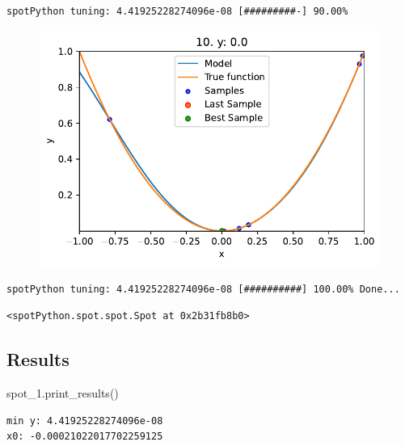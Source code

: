 \documentclass[
  letterpaper,
  DIV=11,
  numbers=noendperiod]{scrreprt}
\newenvironment{Shaded}{\begin{snugshade}}{\end{snugshade}}
\newcommand{\NormalTok}[1]{\textcolor[rgb]{0.00,0.23,0.31}{#1}}
\begin{document}
\begin{verbatim}
spotPython tuning: 4.41925228274096e-08 [#########-] 90.00% 
\end{verbatim}

\begin{figure}[H]

{\centering \includegraphics{04_spot_sklearn_surrogate_files/figure-pdf/cell-21-output-14.pdf}

}

\end{figure}

\begin{verbatim}
spotPython tuning: 4.41925228274096e-08 [##########] 100.00% Done...
\end{verbatim}

\begin{verbatim}
<spotPython.spot.spot.Spot at 0x2b31fb8b0>
\end{verbatim}

\hypertarget{results-2}{%
\subsection{Results}\label{results-2}}

\begin{Shaded}
\begin{Highlighting}[]
\NormalTok{spot\_1.print\_results()}
\end{Highlighting}
\end{Shaded}

\begin{verbatim}
min y: 4.41925228274096e-08
x0: -0.00021022017702259125
\end{verbatim}
\end{document}
